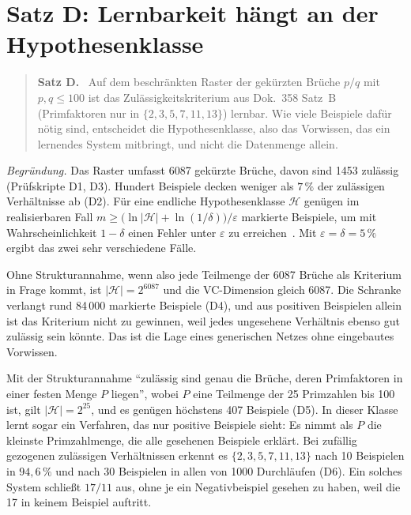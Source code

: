 \section{Satz D: Lernbarkeit hängt an der Hypothesenklasse}

\begin{quote}
\textbf{Satz D.} \BM\ Auf dem beschränkten Raster der gekürzten Brüche
$p/q$ mit $p,q\le100$ ist das Zulässigkeitskriterium aus Dok.~358 Satz~B
(Primfaktoren nur in $\{2,3,5,7,11,13\}$) lernbar. Wie viele Beispiele
dafür nötig sind, entscheidet die Hypothesenklasse, also das Vorwissen,
das ein lernendes System mitbringt, und nicht die Datenmenge allein.
\end{quote}

\emph{Begründung.} Das Raster umfasst 6087 gekürzte Brüche, davon sind
1453 zulässig (Prüfskripte D1, D3). Hundert Beispiele decken weniger als
$7\,\%$ der zulässigen Verhältnisse ab (D2). Für eine endliche
Hypothesenklasse $\mathcal H$ genügen im realisierbaren Fall
$m\ge\bigl(\ln|\mathcal H|+\ln(1/\delta)\bigr)/\varepsilon$ markierte
Beispiele, um mit Wahrscheinlichkeit $1-\delta$ einen Fehler unter
$\varepsilon$ zu erreichen \LM\,\cite{ShalevShwartz2014}. Mit
$\varepsilon=\delta=5\,\%$ ergibt das zwei sehr verschiedene Fälle.

Ohne Strukturannahme, wenn also jede Teilmenge der 6087 Brüche als
Kriterium in Frage kommt, ist $|\mathcal H|=2^{6087}$ und die
VC-Dimension gleich 6087. Die Schranke verlangt rund 84\,000 markierte
Beispiele (D4), und aus positiven Beispielen allein ist das Kriterium
nicht zu gewinnen, weil jedes ungesehene Verhältnis ebenso gut zulässig
sein könnte. Das ist die Lage eines generischen Netzes ohne
eingebautes Vorwissen.

Mit der Strukturannahme \enquote{zulässig sind genau die Brüche, deren
Primfaktoren in einer festen Menge $P$ liegen}, wobei $P$ eine Teilmenge
der 25 Primzahlen bis 100 ist, gilt $|\mathcal H|=2^{25}$, und es
genügen höchstens 407 Beispiele (D5). In dieser Klasse lernt sogar ein
Verfahren, das nur positive Beispiele sieht: Es nimmt als $P$ die
kleinste Primzahlmenge, die alle gesehenen Beispiele erklärt. Bei
zufällig gezogenen zulässigen Verhältnissen erkennt es
$\{2,3,5,7,11,13\}$ nach 10 Beispielen in $94{,}6\,\%$ und nach
30 Beispielen in allen von 1000 Durchläufen (D6). Ein solches System
schließt $17/11$ aus, ohne je ein Negativbeispiel gesehen zu haben, weil
die 17 in keinem Beispiel auftritt.

